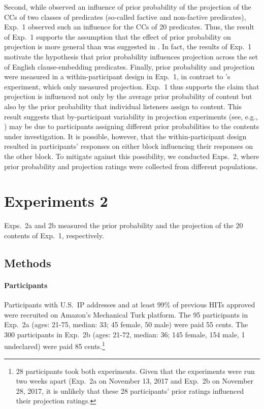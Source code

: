 \documentclass[11pt,fleqn]{article}
\newcommand{\6}{\mbox{$[\hspace*{-.6mm}[$}}
\newcommand{\9}{\mbox{$]\hspace*{-.6mm}]$}}
\newcommand{\citeposs}[1]{\citeauthor{#1}'s}
\begin{document}
Second, while  observed an influence of prior probability of the projection of the CCs of two classes of predicates (so-called factive and non-factive predicates), Exp.~1 observed such an influence for the CCs of 20 predicates. Thus, the result of Exp.~1 supports the assumption that the effect of prior probability on projection is more general than was suggested in . In fact, the results of Exp.~1 motivate the hypothesis that prior probability influences projection across the set of English clause-embedding predicates. Finally, prior probability and projection were measured in a within-participant design in Exp.~1, in contrast to \citeposs{mahler2020} experiment, which only measured projection.  Exp.~1 thus supports the claim that projection is influenced not only by the average prior probability of content but also by the prior probability that individual listeners assign to content. This result suggests that by-participant variability in projection experiments (see, e.g., ) may be due to participants assigning different prior probabilities to the contents under investigation. It is possible, however, that the within-participant design resulted in participants' responses on either block influencing their responses on the other block. To mitigate against this possibility, we conducted Exps.~2, where prior probability and projection ratings were collected from different populations.  

\section{Experiments 2}\label{s3}

Exps.~2a and 2b measured the prior probability and the projection of the 20 contents of Exp.~1, respectively.

\subsection{Methods}


\paragraph{Participants} Participants with U.S.\ IP addresses and at least 99\% of previous HITs approved were recruited on Amazon's Mechanical Turk platform. The 95 participants in Exp.~2a (ages: 21-75, median: 33; 45 female, 50 male) were paid 55 cents. The 300 participants in Exp.~2b (ages: 21-72, median: 36; 145 female, 154 male, 1 undeclared) were paid 85 cents.\footnote{28 participants took both experiments. Given that the experiments were run two weeks apart (Exp.~2a on November 13, 2017 and Exp.~2b on November 28, 2017, it is unlikely that these 28 participants' prior ratings influenced their projection ratings.}
\end{document}
